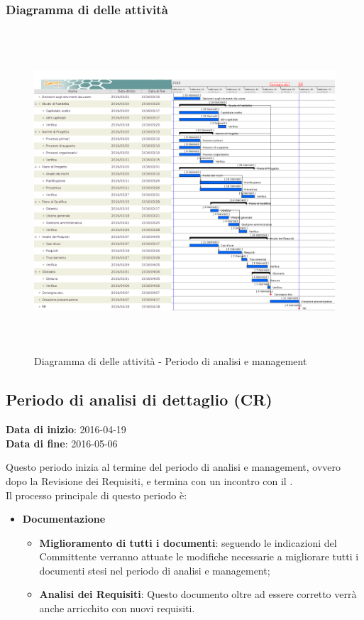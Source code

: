 		
		\subsubsection{Diagramma di  delle attività}
		
		\begin{figure}[!h]
			\centering
			\includegraphics[height=12cm, width=15cm]{img/gantt/A} 
			\caption{Diagramma di  delle attività - Periodo di analisi e management}
		\end{figure}
		
	\subsection{Periodo di analisi di dettaglio (CR)}
	\begin{center}
		\textbf{Data di inizio}: 2016-04-19 \\
		\textbf{Data di fine}: 2016-05-06 \\
	\end{center}
	Questo periodo inizia al termine del periodo di analisi e management, ovvero dopo la Revisione dei Requisiti, e termina con un incontro con il . \\ 
	Il processo principale di questo periodo è:
	\begin{itemize}
		\item \textbf{Documentazione}
		\att
		\begin{itemize}
			\item \textbf{Miglioramento di tutti i documenti}: seguendo le indicazioni del Committente verranno attuate le modifiche necessarie a migliorare tutti i documenti stesi nel periodo di analisi e management;
			\item \textbf{Analisi dei Requisiti}: Questo documento oltre ad essere corretto verrà anche arricchito con nuovi requisiti.
		\end{itemize}
	\end{itemize}
		
